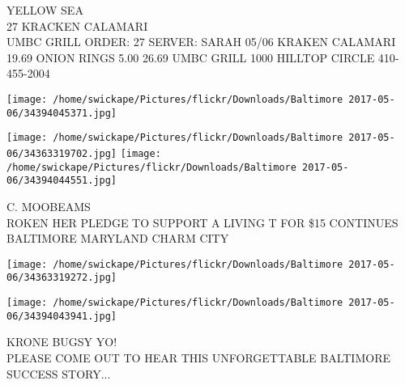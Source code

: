 \documentclass[10pt,letterpaper]{article}
\begin{document}
YELLOW SEA\\
27 KRACKEN CALAMARI\\
UMBC GRILL ORDER: 27 SERVER: SARAH 05/06 KRAKEN CALAMARI 19.69 ONION RINGS 5.00 26.69 UMBC GRILL 1000 HILLTOP CIRCLE 410{-}455{-}2004\\
\pagebreak

\texttt{[image: /home/swickape/Pictures/flickr/Downloads/Baltimore 2017-05-06/34394045371.jpg]}

\vspace{0.25in}
\texttt{[image: /home/swickape/Pictures/flickr/Downloads/Baltimore 2017-05-06/34363319702.jpg]}
\texttt{[image: /home/swickape/Pictures/flickr/Downloads/Baltimore 2017-05-06/34394044551.jpg]}

C. MOOBEAMS\\
ROKEN HER PLEDGE TO SUPPORT A LIVING T FOR \$15 CONTINUES\\
BALTIMORE MARYLAND CHARM CITY\\
\pagebreak

\texttt{[image: /home/swickape/Pictures/flickr/Downloads/Baltimore 2017-05-06/34363319272.jpg]}

\vspace{0.25in}
\texttt{[image: /home/swickape/Pictures/flickr/Downloads/Baltimore 2017-05-06/34394043941.jpg]}

KRONE BUGSY YO!\\
PLEASE COME OUT TO HEAR THIS UNFORGETTABLE BALTIMORE SUCCESS STORY...\\
\pagebreak
\end{document}
